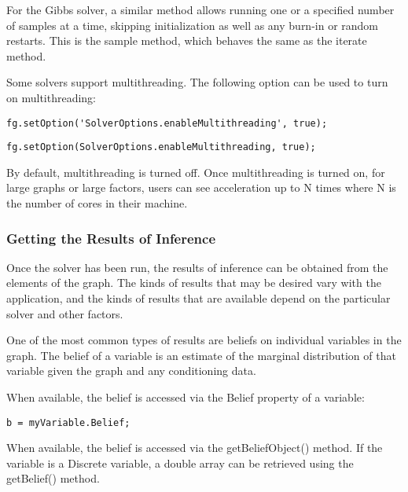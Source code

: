 \fi

For the Gibbs solver, a similar method allows running one or a specified number of samples at a time, skipping initialization as well as any burn-in or random restarts.  This is the sample method, which behaves the same as the iterate method.


Some solvers support multithreading.  The following option can be used to turn on multithreading:

\ifmatlab
\begin{lstlisting}
fg.setOption('SolverOptions.enableMultithreading', true);
\end{lstlisting}
\fi

\ifjava
\begin{lstlisting}
fg.setOption(SolverOptions.enableMultithreading, true);
\end{lstlisting}
\fi

By default, multithreading is turned off.  Once multithreading is turned on, for large graphs or large factors, users can see acceleration up to N times where N is the number of cores in their machine.


\subsubsection{Getting the Results of Inference}

Once the solver has been run, the results of inference can be obtained from the elements of the graph.  The kinds of results that may be desired vary with the application, and the kinds of results that are available depend on the particular solver and other factors.

One of the most common types of results are beliefs on individual variables in the graph.  The belief of a variable is an estimate of the marginal distribution of that variable given the graph and any conditioning data.  

\ifmatlab

When available, the belief is accessed via the Belief property of a variable:

\begin{lstlisting}
b = myVariable.Belief;
\end{lstlisting}
\fi

\ifjava

When available, the belief is accessed via the getBeliefObject() method.  If the variable is a Discrete variable, a double array can be retrieved using the getBelief() method.

